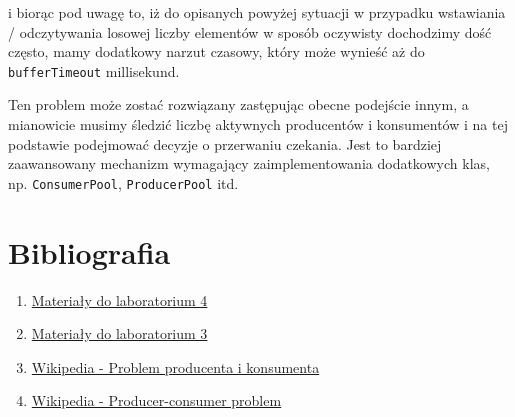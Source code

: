 \documentclass[11pt]{article}
\providecommand{\tightlist}{%
      \setlength{\itemsep}{0pt}\setlength{\parskip}{0pt}}
\begin{document}
\begin{itemize}
  i biorąc pod uwagę to, iż do opisanych powyżej sytuacji w przypadku
  wstawiania / odczytywania losowej liczby elementów w sposób oczywisty
  dochodzimy dość często, mamy dodatkowy narzut czasowy, który może
  wynieść aż do \texttt{bufferTimeout} millisekund.

  Ten problem może zostać rozwiązany zastępując obecne podejście innym,
  a mianowicie musimy śledzić liczbę aktywnych producentów i konsumentów
  i na tej podstawie podejmować decyzje o przerwaniu czekania. Jest to
  bardziej zaawansowany mechanizm wymagający zaimplementowania
  dodatkowych klas, np. \texttt{ConsumerPool}, \texttt{ProducerPool}
  itd.
\end{itemize}

    \hypertarget{bibliografia}{%
\section{Bibliografia}\label{bibliografia}}

\begin{enumerate}
\def\labelenumi{\arabic{enumi}.}
\tightlist
\item
  \href{https://home.agh.edu.pl/~funika/tw/lab4/}{Materiały do
  laboratorium 4}
\item
  \href{https://home.agh.edu.pl/~funika/tw/lab3/}{Materiały do
  laboratorium 3}
\item
  \href{https://pl.wikipedia.org/wiki/Problem_producenta_i_konsumenta}{Wikipedia
  - Problem producenta i konsumenta}
\item
  \href{https://en.wikipedia.org/wiki/Producer\%E2\%80\%93consumer_problem}{Wikipedia
  - Producer-consumer problem}
\end{enumerate}


    
    
    
\end{document}
